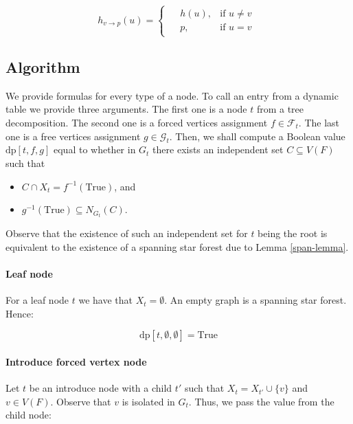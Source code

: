 \documentclass[en]{pracamgr}
\theoremstyle{definition}
\newcommand{\dpt}[1]{\textrm{dp}[#1]}
\newcommand{\true}{\textrm{True}}
\begin{document}
\begin{equation*}
	h_{v \rightarrow p}(u) =
	\begin{cases}
	\begin{aligned}
		&h(u), & \text{if $u \neq v$} \\
		&p, &\text{if $u = v$}
	\end{aligned}
	\end{cases}
\end{equation*}

\subsection{Algorithm}

We provide formulas for every type of a node. To call an entry from a dynamic table we provide three arguments. The first one is a node $t$ from a tree decomposition. The second one is a forced vertices assignment $f \in \mathcal{F}_t$. The last one is  a free vertices assignment $g \in \mathcal{G}_t$. Then, we shall compute a Boolean value $\dpt{t,f,g}$ equal to whether in $G_t$ there exists an independent set $C \subseteq V(F)$ such that
\begin{itemize}
	\item $C \cap X_t = f^{-1}(\true)$, and
	\item $g^{-1}(\true) \subseteq N_{G_t}(C)$.
\end{itemize}

Observe that the existence of such an independent set for $t$ being the root is equivalent to the existence of a spanning star forest due to Lemma \ref{span-lemma}.

\paragraph{Leaf node} For a leaf node $t$ we have that $X_t=\emptyset$. An empty graph is a spanning star forest. Hence:

\begin{equation*}
	\dpt{t,\emptyset,\emptyset}=\true
\end{equation*}

\paragraph{Introduce forced vertex node} Let $t$ be an introduce node with a child $t'$ such that $X_t = X_{t'} \cup \{v\}$ and $v \in V(F)$. Observe that $v$ is isolated in $G_t$. Thus, we pass the value from the child node:
\end{document}
